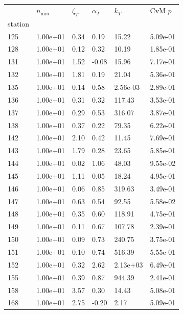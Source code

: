 \begin{figure}[htbp!]
{\begin{minipage}[t]{0.48\linewidth}
\begin{tabular}{llllll}
        \toprule
         & $n_{\min}$ & $\zeta_T$ & $\alpha_T$ & $k_T$ & CvM $p$ \\
        station &  &  &  &  &  \\
        \midrule
                    125 & 1.00e+01 & 0.34 & 0.19 & 15.22 & 5.09e-01\\
                    128 & 1.00e+01 & 0.12 & 0.32 & 10.19 & 1.85e-01\\
                    131 & 1.00e+01 & 1.52 & -0.08 & 15.96 & 7.17e-01\\
                    132 & 1.00e+01 & 1.81 & 0.19 & 21.04 & 5.36e-01\\
                    135 & 1.00e+01 & 0.14 & 0.58 & 2.56e-03 & 2.89e-01\\
                    136 & 1.00e+01 & 0.31 & 0.32 & 117.43 & 3.53e-01\\
                    137 & 1.00e+01 & 0.29 & 0.53 & 316.07 & 3.87e-01\\
                    138 & 1.00e+01 & 0.37 & 0.22 & 79.35 & 6.22e-01\\
                    142 & 1.00e+01 & 2.10 & 0.42 & 11.45 & 7.69e-01\\
                    143 & 1.00e+01 & 1.79 & 0.28 & 23.65 & 5.85e-01\\
                    144 & 1.00e+01 & 0.02 & 1.06 & 48.03 & 9.55e-02\\
                    145 & 1.00e+01 & 1.11 & 0.05 & 18.24 & 4.95e-01\\
                    146 & 1.00e+01 & 0.06 & 0.85 & 319.63 & 3.49e-01\\
                    147 & 1.00e+01 & 0.63 & 0.54 & 92.55 & 5.58e-02\\
                    148 & 1.00e+01 & 0.35 & 0.60 & 118.91 & 4.75e-01\\
                    149 & 1.00e+01 & 0.11 & 0.67 & 107.78 & 2.39e-01\\
                    150 & 1.00e+01 & 0.09 & 0.73 & 240.75 & 3.75e-01\\
                    151 & 1.00e+01 & 0.10 & 0.74 & 516.39 & 5.55e-01\\
                    152 & 1.00e+01 & 0.32 & 2.62 & 2.13e+03 & 6.49e-01\\
                    155 & 1.00e+01 & 0.39 & 0.87 & 944.39 & 2.41e-01\\
                    158 & 1.00e+01 & 3.57 & 0.30 & 14.43 & 5.08e-01\\
                    168 & 1.00e+01 & 2.75 & -0.20 & 2.17 & 5.09e-01\\

\end{tabular}
\end{minipage}}
\end{figure}
